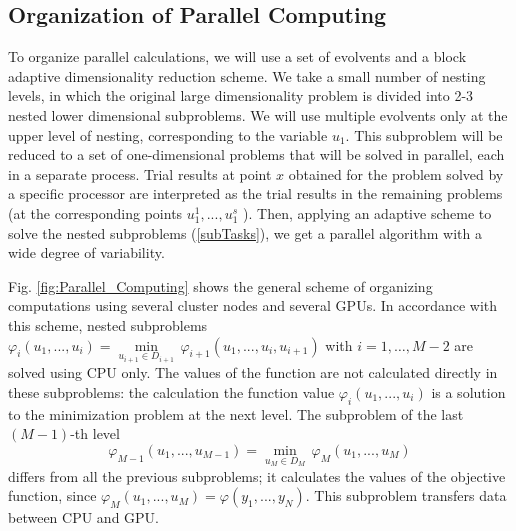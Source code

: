 \documentclass{svproc}
\begin{document}
\subsection{Organization of Parallel Computing}

To organize parallel calculations, we will use a set of evolvents and a block adaptive dimensionality reduction scheme. We take a small number of nesting levels, in which the original large dimensionality problem is divided into 2-3 nested lower dimensional subproblems. We will use multiple evolvents only at the upper level of nesting, corresponding to the variable $u_1$. This subproblem will be reduced to a set of one-dimensional problems that will be solved in parallel, each in a separate process. Trial results at point $x$ obtained for the problem solved by a specific processor are interpreted as the trial results in the remaining problems (at the corresponding points \(u^1_1,..., u^s_1\) ).
Then, applying an adaptive scheme to solve the nested subproblems (\ref{subTasks}), we get a parallel algorithm with a wide degree of variability.

Fig. \ref{fig:Parallel_Computing} shows the general scheme of organizing computations using several cluster nodes and several GPUs. In accordance with this scheme, nested subproblems  ${{\varphi }_{i}}({{u}_{1}},...,{{u}_{i}})=\underset{{{u}_{i+1}}\in {{D}_{i+1}}}{\mathop{\min }}\,{{\varphi }_{i+1}}({{u}_{1}},...,{{u}_{i}},{{u}_{i+1}})$  with \(i=1,\ldots ,M-2\) are solved using CPU only. The values of the function are not calculated directly in these subproblems: the calculation the function value  ${{\varphi }_{i}}({{u}_{1}},...,{{u}_{i}})$ is a solution to the minimization problem at the next level.
The subproblem of the last \((M-1)\)-th level 
\[
{{\varphi }_{M-1}}({{u}_{1}},...,{{u}_{M-1}})=\underset{{{u}_{M}}\in {{D}_{M}}}{\mathop{\min }}\,{{\varphi }_{M}}({{u}_{1}},...,{{u}_{M}})
\]
 differs from all the previous subproblems; it calculates the values of the objective function, since ${{\varphi }_{M}}({{u}_{1}},...,{{u}_{M}})=\varphi ({{y}_{1}},...,{{y}_{N}})$. This subproblem transfers data between CPU and GPU.
\end{document}

